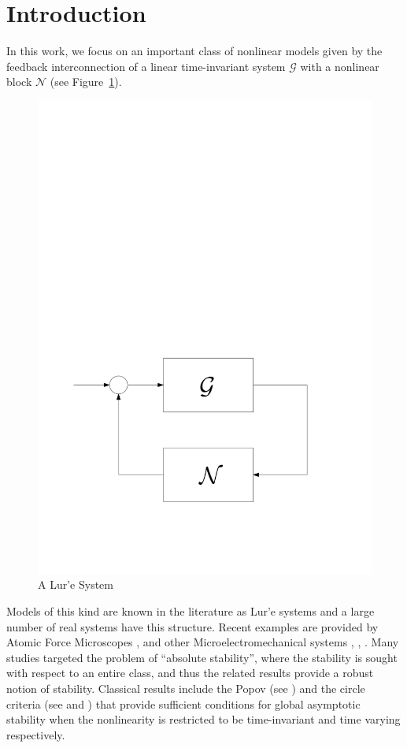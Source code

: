 \documentclass[letterpaper,10pt,conference,twocolumn]{IEEEtran}
\begin{document}
\section{Introduction}
In this work, we focus on an important class of nonlinear models given by the feedback interconnection of a linear time-invariant system $\mathcal{G}$ with a nonlinear block $\mathcal{N}$ (see Figure~\ref{fig:lur'e}).
\begin{figure}
	\centering
	\includegraphics[width=0.75\columnwidth]{lure}
	\caption{A Lur'e System\label{fig:lur'e}}
\end{figure}
Models of this kind are known in the literature as Lur'e systems \cite{LurPos44} and a large number of real systems have this structure. Recent examples are provided by Atomic Force Microscopes \cite{SebSal01},\cite{SebGan05} and other Microelectromechanical systems \cite{WieSeb05}, \cite{SebWie08}, \cite{AgaSah08}.
Many studies targeted the problem of ``absolute stability'',  where the  stability is sought with respect to  an entire class, and thus the related  results provide a robust notion of stability.  
Classical results include the Popov (see \cite{Pop62}) and the circle criteria (see \cite{San64} and \cite{Zam66b}) that provide sufficient conditions for global asymptotic stability  when the nonlinearity is restricted to be  time-invariant and time varying respectively.
\end{document}
